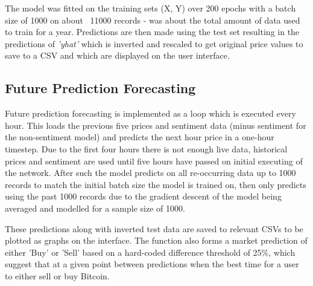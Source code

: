 \documentclass[oneside, 12pt]{article}
\begin{document}
		The model was fitted on the training sets (X, Y) over 200 epochs with a batch size of 1000 on about ~11000 records - was about the total amount of data used to train for a year. Predictions are then made using the test set resulting in the predictions of \textit{'yhat'} which is inverted and rescaled to get original price values to save to a CSV and which are displayed on the user interface.
		
		\newpage
		
		\subsection{Future Prediction Forecasting}
		
		Future prediction forecasting is implemented as a loop which is executed every hour. This loads the previous five prices and sentiment data (minus sentiment for the non-sentiment model) and predicts the next hour price in a one-hour timestep. Due to the first four hours there is not enough live data, historical prices and sentiment are used until five hours have passed on initial executing of the network. After such the model predicts on all re-occurring data up to 1000 records to match the initial batch size the model is trained on, then only predicts using the past 1000 records due to the gradient descent of the model being averaged and modelled for a sample size of 1000.
		
		These predictions along with inverted test data are saved to relevant CSVs to be plotted as graphs on the interface. The function also forms a market prediction of either 'Buy' or 'Sell' based on a hard-coded difference threshold of 25\%, which suggest that at a given point between predictions when the best time for a user to either sell or buy Bitcoin.
		
\end{document}
